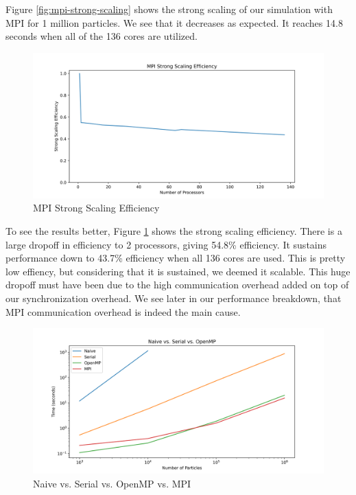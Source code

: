 \documentclass{article}
\begin{document}
Figure \ref{fig:mpi-strong-scaling} shows the strong scaling of our simulation with MPI for 1 million particles. We see that it decreases as expected. It reaches 14.8 seconds when all of the 136 cores are utilized.

\begin{figure}[H]
	\centering
	\includegraphics[width=6in]{figures/mpi_strong_scaling_efficiency.png}
	\caption{MPI Strong Scaling Efficiency}
	\label{fig:mpi-strong-scaling-efficiency}
\end{figure}

To see the results better, Figure \ref{fig:mpi-strong-scaling-efficiency} shows the strong scaling efficiency. There is a large dropoff in efficiency to 2 processors, giving 54.8\% efficiency. It sustains performance down to 43.7\% efficiency when all 136 cores are used. This is pretty low effiency, but considering that it is sustained, we deemed it scalable. This huge dropoff must have been due to the high communication overhead added on top of our synchronization overhead. We see later in our performance breakdown, that MPI communication overhead is indeed the main cause.

\begin{figure}[H]
	\centering
	\includegraphics[width=6in]{figures/mpi_compared.png}
	\caption{Naive vs. Serial vs. OpenMP vs. MPI}
	\label{fig:mpi-compared}
\end{figure}
\end{document}
